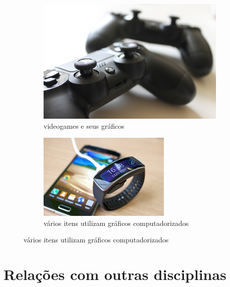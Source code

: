 \documentclass[10 pt,a4paper]{article}
\begin{document}
\begin{figure}[H]
 \centering
 \begin{subfigure}[H]{0.25\linewidth}
 \includegraphics[width=\linewidth]{controle.jpg}
 \caption{videogames e seus gráficos}
 \label{figura1}
 \end{subfigure}
 \begin{subfigure}[H]{0.25\linewidth}
 \includegraphics[width=\linewidth]{celular.jpg}
 \caption{vários itens utilizam gráficos computadorizados}
 \label{figura2} 
 \end{subfigure}
\end{figure}


\section*{Relações com outras disciplinas}
\end{document}
